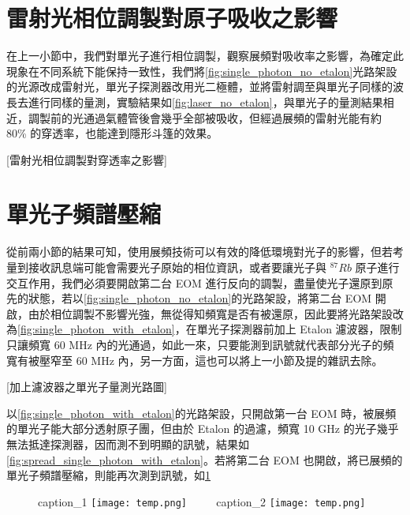 \documentclass[class=NCU_thesis, crop=false]{standalone}
\begin{document}
\section{雷射光相位調製對原子吸收之影響}
在上一小節中，我們對單光子進行相位調製，觀察展頻對吸收率之影響，為確定此現象在不同系統下能保持一致性，我們將\cref{fig:single_photon_no_etalon}光路架設的光源改成雷射光，單光子探測器改用光二極體，並將雷射調至與單光子同樣的波長去進行同樣的量測，實驗結果如\cref{fig:laser_no_etalon}，與單光子的量測結果相近，調製前的光通過氣體管後會幾乎全部被吸收，但經過展頻的雷射光能有約 80\% 的穿透率，也能達到隱形斗篷的效果。

[雷射光相位調製對穿透率之影響]

\section{單光子頻譜壓縮}

從前兩小節的結果可知，使用展頻技術可以有效的降低環境對光子的影響，但若考量到接收訊息端可能會需要光子原始的相位資訊，或者要讓光子與 $^{87}Rb$ 原子進行交互作用，我們必須要開啟第二台 EOM 進行反向的調製，盡量使光子還原到原先的狀態，若以\cref{fig:single_photon_no_etalon}的光路架設，將第二台 EOM 開啟，由於相位調製不影響光強，無從得知頻寬是否有被還原，因此要將光路架設改為\cref{fig:single_photon_with_etalon}，在單光子探測器前加上 Etalon 濾波器，限制只讓頻寬 60 MHz 內的光通過，如此一來，只要能測到訊號就代表部分光子的頻寬有被壓窄至 60 MHz 內，另一方面，這也可以將上一小節及提的雜訊去除。

[加上濾波器之單光子量測光路圖]

以\cref{fig:single_photon_with_etalon}的光路架設，只開啟第一台 EOM 時，被展頻的單光子能大部分透射原子團，但由於 Etalon 的過濾，頻寬 10 GHz 的光子幾乎無法抵達探測器，因而測不到明顯的訊號，結果如\cref{fig:spread_single_photon_with_etalon}。若將第二台 EOM 也開啟，將已展頻的單光子頻譜壓縮，則能再次測到訊號，如\cref{fig:compress_single_photon_with_etalon}

\begin{figure}[!hbt]
    \centering
    \subcaptionbox
        {caption\_1
        \label{fig:spread_single_photon_with_etalon}}
        {\texttt{[image: temp.png]}}
    ~~~~
    \subcaptionbox
        {caption\_2
        \label{fig:compress_single_photon_with_etalon}}
        {\texttt{[image: temp.png]}}
\end{figure}
\end{document}
